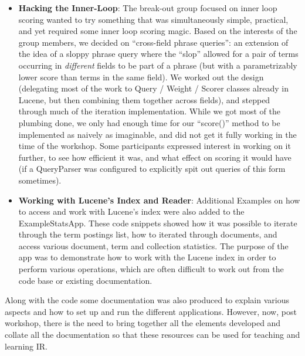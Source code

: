 \begin{itemize}
	\item {\bf Hacking the Inner-Loop}:  The break-out group focused on inner loop scoring wanted to try something that was simultaneously simple, practical, and yet required some inner loop scoring magic.  Based on the interests of the group members, we decided on ``cross-field phrase queries'': an extension of the idea of a sloppy phrase query where the ``slop'' allowed for a pair of terms occurring in {\it different} fields to be part of a phrase (but with a parametrizably lower score than terms in the same field).  We worked out the design (delegating most of the work to Query / Weight / Scorer classes already in Lucene, but then combining them together across fields), and stepped through much of the iteration implementation.  While we got most of the plumbing done, we only had enough time for our ``score()'' method to be implemented as naively as imaginable, and did not get it fully working in the time of the workshop.  Some participants expressed interest in working on it further, to see how efficient it was, and what effect on scoring it would have (if a QueryParser was configured to explicitly spit out queries of this form sometimes).
	\item {\bf Working with Lucene's Index and Reader}: Additional Examples on how to access and work with Lucene's index were also added to the  ExampleStatsApp. These code snippets showed how it was possible to iterate through the term postings list, how to iterated through documents, and access various document, term and collection statistics. The purpose of the app was to demonstrate how to work with the Lucene index in order to perform various operations, which are often difficult to work out from the code base or existing documentation.
\end{itemize}

Along with the code some documentation was also produced to explain various aspects and how to set up and run the different applications. However, now, post workshop, there is the need to bring together all the elements developed and collate all the documentation so that these resources can be used for teaching and learning IR.
